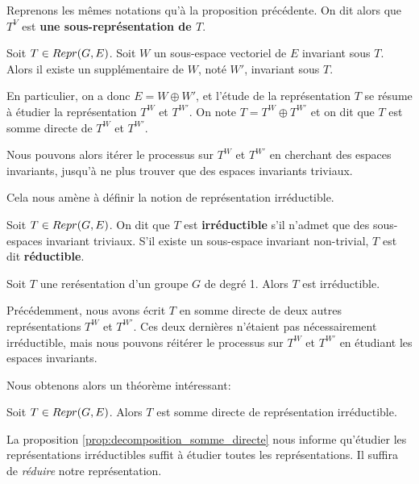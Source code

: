 \begin{definition}
	Reprenons les mêmes notations qu'à la proposition précédente.
	On dit alors que $T^{V}$ est \textbf{une sous-représentation de $T$}.
\end{definition}

\begin{proposition}
	Soit $T \in Repr(G, E)$. Soit $W$ un sous-espace vectoriel de $E$
	invariant sous $T$. Alors il existe un supplémentaire de $W$, noté $W'$,
	invariant sous $T$.
\end{proposition}

En particulier, on a donc $E = W \oplus W'$, et l'étude de la représentation $T$
se résume à étudier la représentation $T^{W}$ et $T^{W'}$. On note $T = T^{W}
\oplus T^{W'}$ et on dit que $T$ est somme directe de $T^{W}$ et $T^{W'}$.

Nous pouvons alors itérer le processus sur $T^{W}$ et $T^{W'}$ en cherchant des
espaces invariants, jusqu'à ne plus trouver que des espaces invariants triviaux.

Cela nous amène à définir la notion de représentation irréductible.

\begin{definition} 
	Soit $T \in Repr(G, E)$. On dit que $T$ est \textbf{irréductible} s'il
	n'admet que des sous-espaces invariant triviaux. S'il existe un sous-espace
	invariant non-trivial, $T$ est dit \textbf{réductible}.
\end{definition}

\begin{exercice}
	Soit $T$ une rerésentation d'un groupe $G$ de degré 1. Alors $T$ est
	irréductible.
\end{exercice}

Précédemment, nous avons écrit $T$ en somme directe de deux autres
représentations $T^{W}$ et $T^{W'}$. Ces deux dernières n'étaient pas nécessairement irréductible,
mais nous pouvons réitérer le processus sur $T^{W}$ et $T^{W'}$ en étudiant les
espaces invariants.

Nous obtenons alors un théorème intéressant:

\begin{proposition}
	\label{prop:decomposition_somme_directe}
	Soit $T \in Repr(G, E)$. Alors $T$ est somme directe de représentation
	irréductible.
\end{proposition}

La proposition \ref{prop:decomposition_somme_directe} nous informe qu'étudier
les représentations irréductibles suffit à étudier toutes les représentations.
Il suffira de \textit{réduire} notre représentation.

